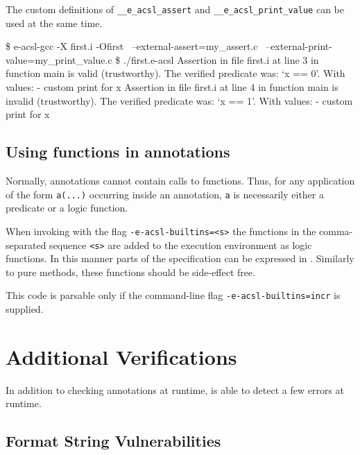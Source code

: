 The custom definitions of \texttt{\_\_e\_acsl\_assert}
and \texttt{\_\_e\_acsl\_print\_value} can be
used at the same time.

\begin{logs}
\$ e-acsl-gcc -X first.i -Ofirst \
    --external-assert=my_assert.c \
    --external-print-value=my_print_value.c
\$ ./first.e-acsl
Assertion in file first.i at line 3 in function main is valid (trustworthy).
The verified predicate was: `x == 0'.
With values:
        - custom print for x
Assertion in file first.i at line 4 in function main is invalid (trustworthy).
The verified predicate was: `x == 1'.
With values:
        - custom print for x
\end{logs}

\subsection{Using \C functions in annotations}

Normally, annotations cannot contain calls to \C functions. Thus, for
any application of the form \lstinline|a(...)| occurring inside an annotation,
\lstinline|a| is necessarily either a predicate or a logic function.

When invoking \framac with the flag \texttt{-e-acsl-builtins=<s>} the \C functions
in the comma-separated sequence \texttt{<s>} are added to the execution
environment as logic functions. In this manner parts of the specification can be
expressed in \C. Similarly to \jml pure methods, these functions should be
side-effect free.


This code is parsable only if the command-line flag \texttt{-e-acsl-builtins=incr} is supplied.

\section{Additional Verifications} %

In addition to checking annotations at runtime, \eacsl is able to detect a few
errors at runtime.

\subsection{Format String Vulnerabilities}

